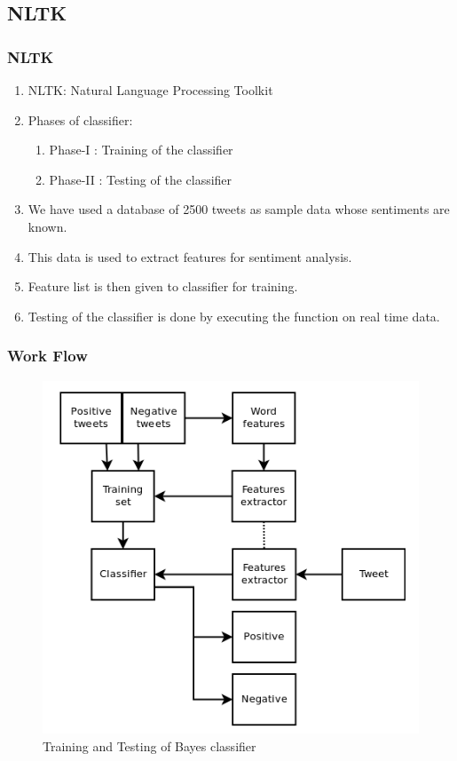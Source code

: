 \documentclass{beamer}
\begin{document}
\subsection{NLTK}
\begin{frame}
\frametitle{NLTK}
\begin{enumerate}
\item NLTK: Natural Language Processing Toolkit
\item Phases of classifier:
\begin{enumerate}
\item Phase-I : Training of the classifier
\item Phase-II : Testing of the classifier
\end{enumerate}

\item We have used a database of 2500 tweets as sample data whose sentiments are known.
\item This data is used to extract features for sentiment analysis.
\item Feature list is then given to classifier for training.
\item Testing of the classifier is done by executing the function on real time data.
\end{enumerate}
\end{frame}


\begin{frame}
\frametitle{Work Flow}
\begin{figure}
\includegraphics[scale=0.45]{./Images/NLTK.png}
\caption{Training and Testing of Bayes classifier}
\end{figure}
\end{frame}
\end{document}

